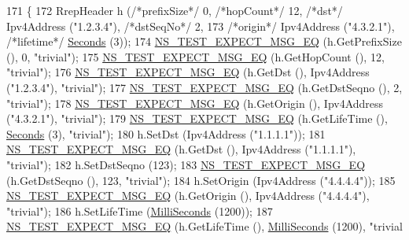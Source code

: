 \begin{DoxyCode}
171   \{
172     RrepHeader h (\textcolor{comment}{/*prefixSize*/} 0, \textcolor{comment}{/*hopCount*/} 12, \textcolor{comment}{/*dst*/} Ipv4Address (\textcolor{stringliteral}{"1.2.3.4"}), \textcolor{comment}{/*dstSeqNo*/} 2,
173                                  \textcolor{comment}{/*origin*/} Ipv4Address (\textcolor{stringliteral}{"4.3.2.1"}), \textcolor{comment}{/*lifetime*/} 
      \hyperlink{group__timecivil_ga33c34b816f8ff6628e33d5c8e9713b9e}{Seconds} (3));
174     \hyperlink{group__testing_ga7304ba46a28d8cf08dfdfd6499cf7068}{NS\_TEST\_EXPECT\_MSG\_EQ} (h.GetPrefixSize (), 0, \textcolor{stringliteral}{"trivial"});
175     \hyperlink{group__testing_ga7304ba46a28d8cf08dfdfd6499cf7068}{NS\_TEST\_EXPECT\_MSG\_EQ} (h.GetHopCount (), 12, \textcolor{stringliteral}{"trivial"});
176     \hyperlink{group__testing_ga7304ba46a28d8cf08dfdfd6499cf7068}{NS\_TEST\_EXPECT\_MSG\_EQ} (h.GetDst (), Ipv4Address (\textcolor{stringliteral}{"1.2.3.4"}), \textcolor{stringliteral}{"trivial"});
177     \hyperlink{group__testing_ga7304ba46a28d8cf08dfdfd6499cf7068}{NS\_TEST\_EXPECT\_MSG\_EQ} (h.GetDstSeqno (), 2, \textcolor{stringliteral}{"trivial"});
178     \hyperlink{group__testing_ga7304ba46a28d8cf08dfdfd6499cf7068}{NS\_TEST\_EXPECT\_MSG\_EQ} (h.GetOrigin (), Ipv4Address (\textcolor{stringliteral}{"4.3.2.1"}), \textcolor{stringliteral}{"trivial"});
179     \hyperlink{group__testing_ga7304ba46a28d8cf08dfdfd6499cf7068}{NS\_TEST\_EXPECT\_MSG\_EQ} (h.GetLifeTime (), \hyperlink{group__timecivil_ga33c34b816f8ff6628e33d5c8e9713b9e}{Seconds} (3), \textcolor{stringliteral}{"trivial"});
180     h.SetDst (Ipv4Address (\textcolor{stringliteral}{"1.1.1.1"}));
181     \hyperlink{group__testing_ga7304ba46a28d8cf08dfdfd6499cf7068}{NS\_TEST\_EXPECT\_MSG\_EQ} (h.GetDst (), Ipv4Address (\textcolor{stringliteral}{"1.1.1.1"}), \textcolor{stringliteral}{"trivial"});
182     h.SetDstSeqno (123);
183     \hyperlink{group__testing_ga7304ba46a28d8cf08dfdfd6499cf7068}{NS\_TEST\_EXPECT\_MSG\_EQ} (h.GetDstSeqno (), 123, \textcolor{stringliteral}{"trivial"});
184     h.SetOrigin (Ipv4Address (\textcolor{stringliteral}{"4.4.4.4"}));
185     \hyperlink{group__testing_ga7304ba46a28d8cf08dfdfd6499cf7068}{NS\_TEST\_EXPECT\_MSG\_EQ} (h.GetOrigin (), Ipv4Address (\textcolor{stringliteral}{"4.4.4.4"}), \textcolor{stringliteral}{"trivial"});
186     h.SetLifeTime (\hyperlink{group__timecivil_gaf26127cf4571146b83a92ee18679c7a9}{MilliSeconds} (1200));
187     \hyperlink{group__testing_ga7304ba46a28d8cf08dfdfd6499cf7068}{NS\_TEST\_EXPECT\_MSG\_EQ} (h.GetLifeTime (), \hyperlink{group__timecivil_gaf26127cf4571146b83a92ee18679c7a9}{MilliSeconds} (1200), \textcolor{stringliteral}{"trivial
}
\end{DoxyCode}
